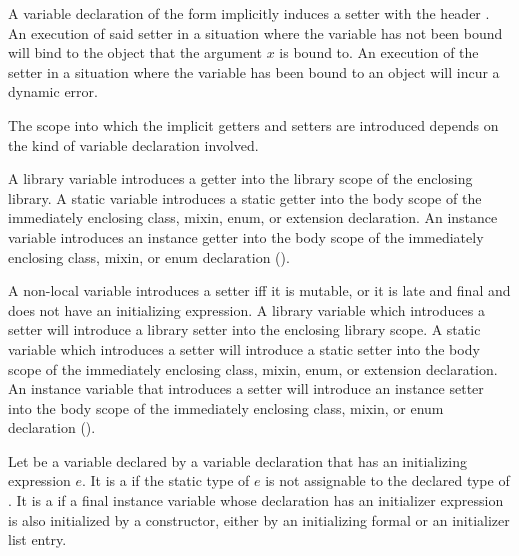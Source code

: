 \documentclass[makeidx]{article}
\begin{document}
\LMHash{}%
A variable declaration of the form
implicitly induces a setter with the header
.
An execution of said setter
in a situation where the variable \id{} has not been bound
will bind \id{} to the object that the argument $x$ is bound to.
An execution of the setter
in a situation where the variable \id{} has been bound to an object
will incur a dynamic error.
\EndCase

\LMHash{}%
The scope into which the implicit getters and setters are introduced
depends on the kind of variable declaration involved.

\LMHash{}%
A library variable introduces a getter into
the library scope of the enclosing library.
A static variable introduces a static getter into
the body scope of the immediately enclosing
class, mixin, enum, or extension declaration.
An instance variable introduces an instance getter into
the body scope of the immediately enclosing
class, mixin, or enum declaration
().

\LMHash{}%
A non-local variable introduces a setter if{}f it is mutable,
or it is late and final and does not have an initializing expression.
A library variable which introduces a setter will introduce
a library setter into the enclosing library scope.
A static variable which introduces a setter will introduce
a static setter into the body scope of the immediately enclosing
class, mixin, enum, or extension declaration.
An instance variable that introduces a setter will introduce
an instance setter into the body scope of the immediately enclosing
class, mixin, or enum declaration
().

\LMHash{}%
Let \id{} be a variable declared by a variable declaration
that has an initializing expression $e$.
It is a  if the static type of $e$
is not assignable to the declared type of \id.
It is a  if a final instance variable
whose declaration has an initializer expression
is also initialized by a constructor,
either by an initializing formal or an initializer list entry.
\end{document}
